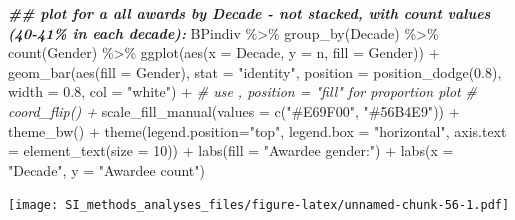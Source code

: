 \documentclass[
]{article}
\newenvironment{Shaded}{\begin{snugshade}}{\end{snugshade}}
\newcommand{\AttributeTok}[1]{\textcolor[rgb]{0.77,0.63,0.00}{#1}}
\newcommand{\CommentTok}[1]{\textcolor[rgb]{0.56,0.35,0.01}{\textit{#1}}}
\newcommand{\DecValTok}[1]{\textcolor[rgb]{0.00,0.00,0.81}{#1}}
\newcommand{\DocumentationTok}[1]{\textcolor[rgb]{0.56,0.35,0.01}{\textbf{\textit{#1}}}}
\newcommand{\FloatTok}[1]{\textcolor[rgb]{0.00,0.00,0.81}{#1}}
\newcommand{\FunctionTok}[1]{\textcolor[rgb]{0.00,0.00,0.00}{#1}}
\newcommand{\NormalTok}[1]{#1}
\newcommand{\SpecialCharTok}[1]{\textcolor[rgb]{0.00,0.00,0.00}{#1}}
\newcommand{\StringTok}[1]{\textcolor[rgb]{0.31,0.60,0.02}{#1}}
\begin{document}
\begin{Shaded}
\begin{Highlighting}[]
\DocumentationTok{\#\# plot for a all awards by Decade {-} not stacked, with count values (40{-}41\% in each decade):}
\NormalTok{BPindiv }\SpecialCharTok{\%\textgreater{}\%} 
  \FunctionTok{group\_by}\NormalTok{(Decade) }\SpecialCharTok{\%\textgreater{}\%}
  \FunctionTok{count}\NormalTok{(Gender) }\SpecialCharTok{\%\textgreater{}\%}
  \FunctionTok{ggplot}\NormalTok{(}\FunctionTok{aes}\NormalTok{(}\AttributeTok{x =}\NormalTok{ Decade, }\AttributeTok{y =}\NormalTok{ n, }\AttributeTok{fill =}\NormalTok{ Gender)) }\SpecialCharTok{+}
  \FunctionTok{geom\_bar}\NormalTok{(}\FunctionTok{aes}\NormalTok{(}\AttributeTok{fill =}\NormalTok{ Gender), }\AttributeTok{stat =} \StringTok{"identity"}\NormalTok{, }\AttributeTok{position =} \FunctionTok{position\_dodge}\NormalTok{(}\FloatTok{0.8}\NormalTok{), }\AttributeTok{width =} \FloatTok{0.8}\NormalTok{, }\AttributeTok{col =} \StringTok{"white"}\NormalTok{) }\SpecialCharTok{+} \CommentTok{\# use , position = "fill" for proportion plot}
\CommentTok{\#  coord\_flip() + }
  \FunctionTok{scale\_fill\_manual}\NormalTok{(}\AttributeTok{values =} \FunctionTok{c}\NormalTok{(}\StringTok{"\#E69F00"}\NormalTok{, }\StringTok{"\#56B4E9"}\NormalTok{)) }\SpecialCharTok{+}
  \FunctionTok{theme\_bw}\NormalTok{() }\SpecialCharTok{+}
  \FunctionTok{theme}\NormalTok{(}\AttributeTok{legend.position=}\StringTok{"top"}\NormalTok{, }\AttributeTok{legend.box =} \StringTok{"horizontal"}\NormalTok{, }\AttributeTok{axis.text =} \FunctionTok{element\_text}\NormalTok{(}\AttributeTok{size =} \DecValTok{10}\NormalTok{)) }\SpecialCharTok{+}
  \FunctionTok{labs}\NormalTok{(}\AttributeTok{fill =} \StringTok{"Awardee gender:"}\NormalTok{) }\SpecialCharTok{+}
  \FunctionTok{labs}\NormalTok{(}\AttributeTok{x =} \StringTok{"Decade"}\NormalTok{, }\AttributeTok{y =} \StringTok{"Awardee count"}\NormalTok{)  }
\end{Highlighting}
\end{Shaded}

\texttt{[image: SI\_methods\_analyses\_files/figure-latex/unnamed-chunk-56-1.pdf]}
\end{document}
